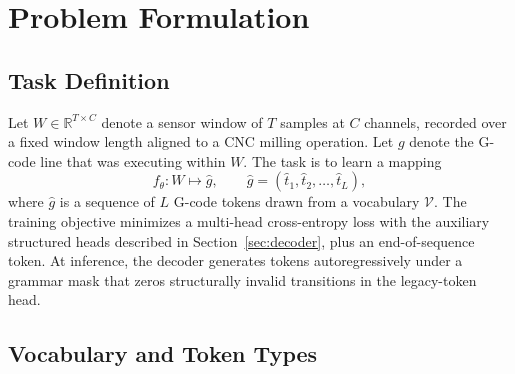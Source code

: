 \documentclass[sensors,article,submit,moreauthors,pdftex]{Definitions/mdpi}
\begin{document}
\section{Problem Formulation}
\label{sec:problem}

\subsection{Task Definition}
\label{sec:task}

Let $W \in \mathbb{R}^{T \times C}$ denote a sensor window of $T$ samples at $C$ channels, recorded over a fixed window length aligned to a CNC milling operation. Let $g$ denote the G-code line that was executing within $W$. The task is to learn a mapping
\begin{equation*}
  f_\theta: W \mapsto \hat{g}, \qquad \hat{g} = (\hat{t}_1, \hat{t}_2, \dots, \hat{t}_L),
\end{equation*}
where $\hat{g}$ is a sequence of $L$ G-code tokens drawn from a vocabulary $\mathcal{V}$. The training objective minimizes a multi-head cross-entropy loss with the auxiliary structured heads described in Section~\ref{sec:decoder}, plus an end-of-sequence token. At inference, the decoder generates tokens autoregressively under a grammar mask that zeros structurally invalid transitions in the legacy-token head.

\subsection{Vocabulary and Token Types}
\label{sec:problem-vocab}
\end{document}
